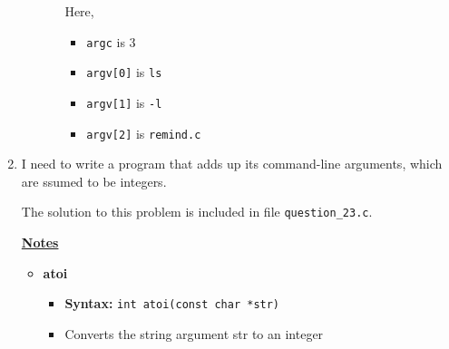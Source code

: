 \documentclass[12pt]{article}
\begin{document}
\begin{enumerate}[1.]
\begin{itemize}
\begin{itemize}
            \bigskip

            Here,

            \begin{itemize}
                \item \texttt{argc} is 3
                \item \texttt{argv[0]} is \texttt{ls}
                \item \texttt{argv[1]} is \texttt{-l}
                \item \texttt{argv[2]} is \texttt{remind.c}
            \end{itemize}
        \end{itemize}
    \end{itemize}

    \item

    I need to write a program that adds up its command-line arguments, which are ssumed to be integers.

    \bigskip

    The solution to this problem is included in file \texttt{question\_23.c}.

    \bigskip

    \underline{\textbf{Notes}}

    \begin{itemize}
        \item \textbf{atoi}
        \begin{itemize}
            \item \textbf{Syntax:} \texttt{int atoi(const char *str)}
            \item Converts the string argument str to an integer
        \end{itemize}
    \end{itemize}


\end{enumerate}
\end{document}
